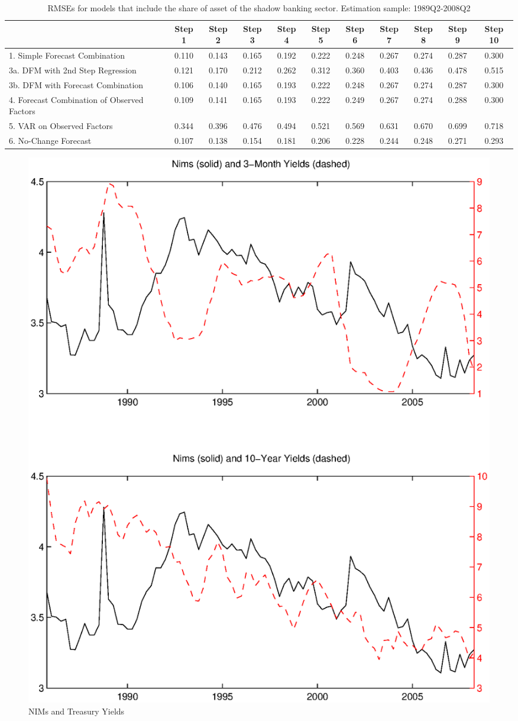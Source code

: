 \documentclass[12pt]{article}
\begin{document}
{\normalsize \clearpage
\begin{table}
\caption{RMSEs for models that include the share of asset of the shadow banking sector. Estimation sample: 1989Q2-2008Q2}
\center
\begin{tabular}{|l|c|c|c|c|c|c|c|c|c|c|}
\hline
&Step 1 &Step 2 &Step 3 &Step 4 &Step 5 &Step 6 &Step 7 &Step 8 &Step 9 &Step 10\\
\hline
1. Simple Forecast Combination             &0.110&0.143&0.165&0.192&0.222&0.248&0.267&0.274&0.287&0.300\\
3a. DFM with 2nd Step Regression           &0.121&0.170&0.212&0.262&0.312&0.360&0.403&0.436&0.478&0.515\\
3b. DFM with Forecast Combination          &0.106&0.140&0.165&0.193&0.222&0.248&0.267&0.274&0.287&0.300\\
4. Forecast Combination of Observed Factors&0.109&0.141&0.165&0.193&0.222&0.249&0.267&0.274&0.288&0.300\\
5. VAR on Observed Factors                 &0.344&0.396&0.476&0.494&0.521&0.569&0.631&0.670&0.699&0.718\\
6. No-Change Forecast                      &0.107&0.138&0.154&0.181&0.206&0.228&0.244&0.248&0.271&0.293\\
\hline
\end{tabular}
\end{table}
}


\begin{figure}[tbp]
\caption{NIMs and Treasury Yields} \label{figure_nims_rates}
\center
\includegraphics[scale=0.85]{figure_nims_rates.ps}
\end{figure}
\end{document}
